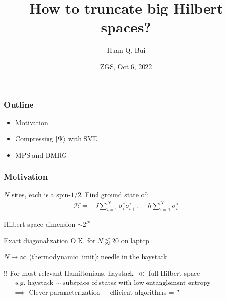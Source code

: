 \documentclass{beamer}
\title[\textcolor{white}{{}}]
{
	How to truncate big Hilbert spaces? 
}
\author[Bui] %
{Huan Q. Bui
	}
\institute[MIT] %
{
}
\date{ZGS, Oct 6, 2022}
\theoremstyle{definition}
\begin{document}
 
\frame{\titlepage}


\begin{frame}
	\frametitle{Outline}
	\begin{itemize}
		\item Motivation
		\item Compressing $\ket{\Psi}$ with SVD
		\item MPS and DMRG
	\end{itemize}
\end{frame}


\begin{frame}
	\frametitle{Motivation}
	
	$N$ sites, each is a spin-$1/2$. Find ground state of:
	\begin{align*}
		\mathcal{H} = - J \sum_{i=1}^N \sigma_i^z \sigma_{i+1}^z - h \sum_{i=1}^N \sigma^x_i
	\end{align*}	
	
	
	Hilbert space dimension $\sim 2^N$\\
	
	\vspace{8pt}
	
	Exact diagonalization O.K. for $N \lessapprox 20$ on laptop\\
	
	\vspace{8pt}
	
	$N \to \infty$ (thermodynamic limit): needle in the haystack\\
	
	\vspace{8pt}
	
	{$\boxed{!!}$ For most relevant Hamiltonians, haystack $\ll$ full Hilbert space }\\
	\vspace{2pt}
	{$\quad\,\,\,\,$e.g. haystack $\sim$ subspace of states with low entanglement entropy }\\
	\vspace{2pt}
	{$\quad\,\,\implies$ Clever parameterization + efficient algorithms = \smiley{}?}
	
		
	
\end{frame}
\end{document}
